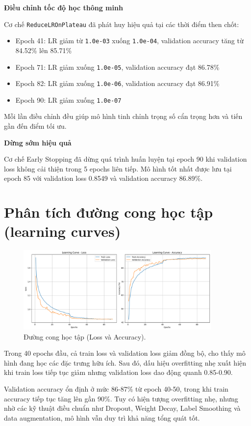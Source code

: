 \documentclass[12pt, a4paper, openany]{report}
\begin{document}
\textbf{Điều chỉnh tốc độ học thông minh} 

Cơ chế \texttt{ReduceLROnPlateau} đã phát huy hiệu quả tại các thời điểm then chốt:
\begin{itemize}
    \item Epoch 41: LR giảm từ \texttt{1.0e-03} xuống \texttt{1.0e-04}, validation accuracy tăng từ 84.52\% lên 85.71\%
    \item Epoch 71: LR giảm xuống \texttt{1.0e-05}, validation accuracy đạt 86.78\%
    \item Epoch 82: LR giảm xuống \texttt{1.0e-06}, validation accuracy đạt 86.91\%
    \item Epoch 90: LR giảm xuống \texttt{1.0e-07}
\end{itemize}
Mỗi lần điều chỉnh đều giúp mô hình tinh chỉnh trọng số cẩn trọng hơn và tiến gần đến điểm tối ưu.

\textbf{Dừng sớm hiệu quả} 

Cơ chế Early Stopping đã dừng quá trình huấn luyện tại epoch 90 khi validation loss không cải thiện trong 5 epochs liên tiếp. Mô hình tốt nhất được lưu tại epoch 85 với validation loss 0.8549 và validation accuracy 86.89\%.

\section{Phân tích đường cong học tập (learning curves)}
\begin{figure}[H]
    \centering
    \includegraphics[width=0.9\textwidth]{learning_curves.png}
    \caption{Đường cong học tập (Loss và Accuracy).}
    \label{fig:learning_curves}
\end{figure}
Trong 40 epochs đầu, cả train loss và validation loss giảm đồng bộ, cho thấy mô hình đang học các đặc trưng hữu ích. Sau đó, dấu hiệu overfitting nhẹ xuất hiện khi train loss tiếp tục giảm nhưng validation loss dao động quanh 0.85-0.90.

Validation accuracy ổn định ở mức 86-87\% từ epoch 40-50, trong khi train accuracy tiếp tục tăng lên gần 90\%. Tuy có hiện tượng overfitting nhẹ, nhưng nhờ các kỹ thuật điều chuẩn như Dropout, Weight Decay, Label Smoothing và data augmentation, mô hình vẫn duy trì khả năng tổng quát tốt.
\end{document}
